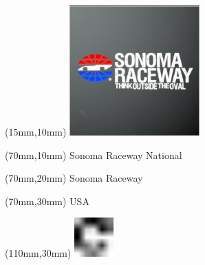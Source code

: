 \null\newpage
\begin{textblock*}{50mm}(15mm,10mm)%
\includegraphics[width=50mm]{LG/2015-05-20_00096.png}
\end{textblock*}
\begin{textblock*}{130mm}(70mm,10mm)%
{\fontsize{20}{20}\selectfont Sonoma Raceway National}\\
\end{textblock*}
\begin{textblock*}{120mm}(70mm,20mm)%
{\fontsize{16}{16}\selectfont Sonoma Raceway}\\
\end{textblock*}
\begin{textblock*}{120mm}(70mm,30mm)%
{\fontsize{12}{12}\selectfont USA}
\end{textblock*}
\begin{textblock*}{30mm}(110mm,30mm)%
\centering
\includegraphics[height=15mm]{icons/fa-rotate-right.pdf}
\end{textblock*}
